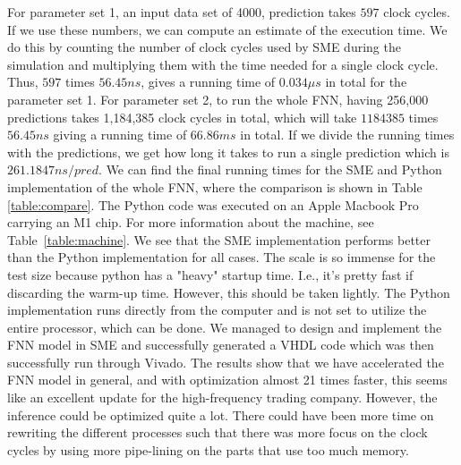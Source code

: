 For parameter set 1, an input data set of 4000, prediction takes $597$ clock cycles. If we use these numbers, we can compute an estimate of the execution time. We do this by counting the number of clock cycles used by SME during the simulation and multiplying them with the time needed for a single clock cycle. Thus,
$597$ times $56.45 ns $, gives a running time of $0.034 \mu s$ in total for the parameter set 1.
For parameter set 2, to run the whole FNN, having 256,000 predictions takes 1,184,385 clock cycles in total, which will take $1184385$ times $56.45 ns $ giving a running time of $66.86 ms$ in total.
If we divide the running times with the predictions, we get how long it takes to run a single prediction which is $261.1847 ns/pred$.
We can find the final running times for the SME and Python implementation of the whole FNN, where the comparison is shown in Table \ref{table:compare}. The Python code was executed on an Apple Macbook Pro carrying an M1 chip. For more information about the machine, see Table~\ref{table:machine}. We see that the SME implementation performs better than the Python implementation for all cases. The scale is so immense for the test size because python has a "heavy" startup time. I.e., it's pretty fast if discarding the warm-up time.
However, this should be taken lightly. The Python implementation runs directly from the computer and is not set to utilize the entire processor, which can be done. 
We managed to design and implement the FNN model in SME and successfully generated a VHDL code which was then successfully run through Vivado. The results show that we have accelerated the FNN model in general, and with optimization almost 21 times faster, this seems like an excellent update for the high-frequency trading company. However, the inference could be optimized quite a lot. There could have been more time on rewriting the different processes such that there was more focus on the clock cycles by using more pipe-lining on the parts that use too much memory. 



